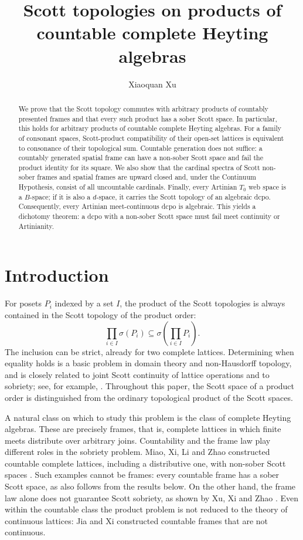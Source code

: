 \documentclass[11pt,reqno]{amsart}
\title[Scott topologies of complete Heyting algebras]
{Scott topologies on products of countable complete Heyting algebras}
\author{Xiaoquan Xu}
\theoremstyle{definition}
\numberwithin{equation}{section}
\begin{document}
\begin{abstract}
We prove that the Scott topology commutes with arbitrary products of
countably presented frames and that every such product has a sober Scott
space. In particular, this holds for arbitrary products of countable
complete Heyting algebras. For a family of consonant spaces, Scott-product
compatibility of their open-set lattices is equivalent to consonance of
their topological sum. Countable generation does not suffice: a countably
generated spatial frame can have a non-sober Scott space and fail the
product identity for its square. We also show that the cardinal spectra
of Scott non-sober frames and spatial frames are upward closed and, under
the Continuum Hypothesis, consist of all uncountable cardinals. Finally,
every Artinian $T_0$ web space is a $B$-space; if it is also a $d$-space,
it carries the Scott topology of an algebraic dcpo. Consequently, every
Artinian meet-continuous dcpo is algebraic. This yields a dichotomy theorem:
a dcpo with a non-sober Scott space must fail meet continuity or Artinianity.
\end{abstract}

\maketitle

\section{Introduction}\label{sec:intro}

For posets $P_i$ indexed by a set $I$, the product of the Scott topologies is
always contained in the Scott topology of the product order:
\begin{equation}\label{eq:general-inclusion}
  \prod_{i\in I}\sigma(P_i)
  \subseteq
  \sigma\!\left(\prod_{i\in I}P_i\right).
\end{equation}
The inclusion can be strict, already for two complete lattices. Determining
when equality holds is a basic problem in domain theory and non-Hausdorff
topology, and is closely related to joint Scott continuity of lattice
operations and to sobriety; see, for example,
\citep{GierzEtAl2003,LawsonXu2024}. Throughout this paper, the Scott space
of a product order is distinguished from the ordinary topological product
of the Scott spaces.

A natural class on which to study this problem is the class of complete
Heyting algebras. These are precisely frames, that is, complete lattices
in which finite meets distribute over arbitrary joins. Countability and
the frame law play different roles in the sobriety problem. Miao, Xi, Li
and Zhao constructed countable complete lattices, including a distributive
one, with non-sober Scott spaces \citep{MiaoXiLiZhao2023}. Such examples
cannot be frames: every countable frame has a sober Scott space, as also
follows from the results below. On the other hand, the frame law alone
does not guarantee Scott sobriety, as shown by Xu, Xi and Zhao
\citep{XuXiZhao2021}. Even within the countable class the product problem
is not reduced to the theory of continuous lattices: Jia and Xi
\citep{JiaXi2026} constructed countable frames that are not continuous.
\end{document}

